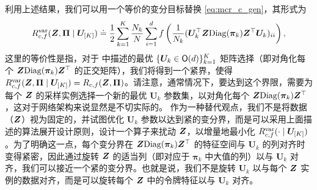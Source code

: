 \documentclass[../../book-main.tex]{subfiles}
\begin{document}
利用上述结果，我们可以用一个等价的变分目标替换 \eqref{eq:mcr_c_gen}，其形式为
\vspace{-2mm}
\begin{equation}
    \label{eq:var_comp}
    R^{\rm var}_{c,f} (\bm{Z},\bm \Pi \mid \bm U_{[K]}) \doteq \frac{1}{2}\sum_{k=1}^K \frac{N_k}{N} \sum_{i=1}^{d} f\left(\frac{1}{N_k} (\bm U_{k}^{\top} \bm{Z} \mathrm{Diag}(\bm \pi_k) \bm Z^{\top} \bm U_{k})_{ii} \right),
\end{equation}
这里的等价性是指，对于  中描述的最优 $\{ \bm U_k \in \mathsf{O}(d)\}_{k=1}^K$ 矩阵选择（即对角化每个 $\bm{Z} \mathrm{Diag}(\bm \pi_k) \bm{Z}^\top $ 的正交矩阵），我们将得到一个紧界，使得 $ R^{\rm var}_{c,f} (\bm{Z},\bm \Pi \mid \bm U_{[K]}) = R_{c,f} (\bm{Z},\bm \Pi)$。请注意，通常情况下，要达到这个界限，需要为每个 $\bm{Z}$ 的采样实例选择一个新的最优 $\bm U_{k}$ 参数集，以对角化每个 $\bm{Z}\mathrm{Diag}(\bm \pi_{k})\bm{Z}^{\top}$，这对于网络架构来说显然是不切实际的。
作为一种替代观点，我们不是将数据（$\bm{Z}$）视为固定的，并试图优化 $\bm U_k$ 参数以达到紧的变分界，而是可以采用上面描述的算法展开设计原则，设计一个算子来扰动 $\bm{Z}$，以增量地最小化 $R_{c, f}^{\rm var}(\cdot \mid \bm U_{[K]})$。为了明确这一点，每个变分界在 $\bm{Z} \mathrm{Diag}(\bm \pi_k) \bm{Z}^\top$ 的特征空间与 $\bm U_k$ 的列对齐时变得紧密，因此通过旋转 $\bm{Z}$ 的适当列（即对应于 $\bm \pi_k$ 中大值的列）以与 $\bm U_k$ 对齐，我们可以接近一个紧的变分界。也就是说，我们不是旋转 $\bm U_k$ 以与每个 $\bm{Z}$ 实例的数据对齐，而是可以旋转每个 $\bm{Z}$ 中的令牌特征以与 $\bm U_k$ 对齐。
\end{document}
